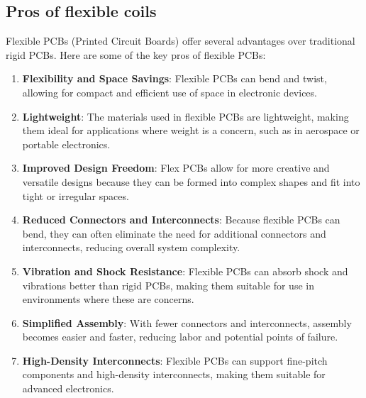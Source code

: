 \subsection{Pros of flexible coils}
Flexible PCBs (Printed Circuit Boards) offer several advantages over traditional rigid PCBs. Here are some of the key pros of flexible PCBs:

\begin{enumerate}
    \item \textbf{Flexibility and Space Savings}: Flexible PCBs can bend and twist, allowing for compact and efficient use of space in electronic devices.
    
    \item \textbf{Lightweight}: The materials used in flexible PCBs are lightweight, making them ideal for applications where weight is a concern, such as in aerospace or portable electronics.
    
    \item \textbf{Improved Design Freedom}: Flex PCBs allow for more creative and versatile designs because they can be formed into complex shapes and fit into tight or irregular spaces.
    
    \item \textbf{Reduced Connectors and Interconnects}: Because flexible PCBs can bend, they can often eliminate the need for additional connectors and interconnects, reducing overall system complexity.
    
    \item \textbf{Vibration and Shock Resistance}: Flexible PCBs can absorb shock and vibrations better than rigid PCBs, making them suitable for use in environments where these are concerns.

    \item \textbf{Simplified Assembly}: With fewer connectors and interconnects, assembly becomes easier and faster, reducing labor and potential points of failure.
    
    \item \textbf{High-Density Interconnects}: Flexible PCBs can support fine-pitch components and high-density interconnects, making them suitable for advanced electronics.
\end{enumerate}